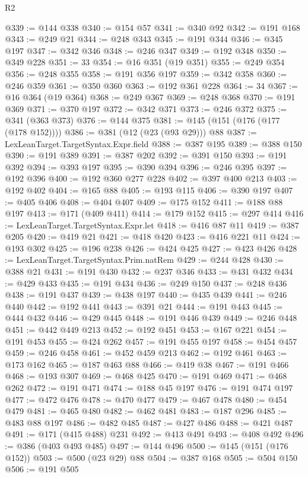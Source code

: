 \begin{lexlean}{R2}
\begin{coremodule}
@339 := @144 @338
@340 := @154 @57
@341 := @340 @92
@342 := @191 @168
@343 := @249 @21
@344 := @248 @343
@345 := @191 @344
@346 := @345 @197
@347 := @342 @346
@348 := @246 @347
@349 := @192 @348
@350 := @349 @228
@351 := 33
@354 := @16 @351 (@19 @351)
@355 := @249 @354
@356 := @248 @355
@358 := @191 @356 @197
@359 := @342 @358
@360 := @246 @359
@361 := @350 @360
@363 := @192 @361 @228
@364 := 34
@367 := @16 @364 (@19 @364)
@368 := @249 @367
@369 := @248 @368
@370 := @191 @369
@371 := @370 @197
@372 := @342 @371
@373 := @246 @372
@375 := @341 (@363 @373)
@376 := @144 @375
@381 := @145 (@151 (@176 (@177 (@178 @152))))
@386 := @381 (@12 (@23 (@93 @29))) @88
@387 := LexLeanTarget.TargetSyntax.Expr.field
@388 := @387 @195
@389 := @388 @150
@390 := @191 @389
@391 := @387 @202
@392 := @391 @150
@393 := @191 @392
@394 := @393 @197
@395 := @390 @394
@396 := @246 @395
@397 := @192 @396
@400 := @192 @360 @277 @228
@402 := @397 @400 @213
@403 := @192 @402
@404 := @165 @88
@405 := @193 @115
@406 := @390 @197
@407 := @405 @406
@408 := @404 @407
@409 := @175 @152
@411 := @188 @88 @197
@413 := @171 (@409 @411)
@414 := @179 @152
@415 := @297 @414
@416 := LexLeanTarget.TargetSyntax.Expr.let
@418 := @416 @87 @11
@419 := @387 @205
@420 := @419 @21
@421 := @418 @420
@423 := @416 @221 @11
@424 := @193 @302
@425 := @196 @238
@426 := @424 @425
@427 := @423 @426
@428 := LexLeanTarget.TargetSyntax.Prim.natRem
@429 := @244 @428
@430 := @388 @21
@431 := @191 @430
@432 := @237 @346
@433 := @431 @432
@434 := @429 @433
@435 := @191 @434
@436 := @249 @150
@437 := @248 @436
@438 := @191 @437
@439 := @438 @197
@440 := @435 @439
@441 := @246 @440
@442 := @192 @441
@443 := @391 @21
@444 := @191 @443
@445 := @444 @432
@446 := @429 @445
@448 := @191 @446 @439
@449 := @246 @448
@451 := @442 @449 @213
@452 := @192 @451
@453 := @167 @221
@454 := @191 @453
@455 := @424 @262
@457 := @191 @455 @197
@458 := @454 @457
@459 := @246 @458
@461 := @452 @459 @213
@462 := @192 @461
@463 := @173 @162
@465 := @187 @463 @88
@466 := @419 @38
@467 := @191 @466
@468 := @193 @307
@469 := @468 @425
@470 := @191 @469
@471 := @468 @262
@472 := @191 @471
@474 := @188 @45 @197
@476 := @191 @474 @197
@477 := @472 @476
@478 := @470 @477
@479 := @467 @478
@480 := @454 @479
@481 := @465 @480
@482 := @462 @481
@483 := @187 @296
@485 := @483 @88 @197
@486 := @482 @485
@487 := @427 @486
@488 := @421 @487
@491 := @171 (@415 @488) @231
@492 := @413 @491
@493 := @408 @492
@496 := @386 (@403 @493 @485)
@497 := @144 @496
@500 := @145 (@151 (@176 @152))
@503 := @500 (@23 @29) @88
@504 := @387 @168
@505 := @504 @150
@506 := @191 @505

\end{coremodule}
\end{lexlean}
